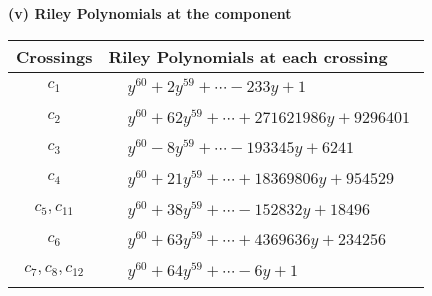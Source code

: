 \documentclass[1p]{elsarticle_modified}
\theoremstyle{definition}
\begin{document}
\newpage\renewcommand{\arraystretch}{1}
\flushleft \textbf{(v) Riley Polynomials at the component}\newline \\
\begin{tabular}{m{50pt}|m{274pt}}
Crossings & \hspace{64pt}Riley Polynomials at each crossing \\
\hline $$\begin{aligned}c_{1}\end{aligned}$$&$\begin{aligned}
&y^{60}+2 y^{59}+\cdots-233 y+1
\end{aligned}$\\
\hline $$\begin{aligned}c_{2}\end{aligned}$$&$\begin{aligned}
&y^{60}+62 y^{59}+\cdots+271621986 y+9296401
\end{aligned}$\\
\hline $$\begin{aligned}c_{3}\end{aligned}$$&$\begin{aligned}
&y^{60}-8 y^{59}+\cdots-193345 y+6241
\end{aligned}$\\
\hline $$\begin{aligned}c_{4}\end{aligned}$$&$\begin{aligned}
&y^{60}+21 y^{59}+\cdots+18369806 y+954529
\end{aligned}$\\
\hline $$\begin{aligned}c_{5},c_{11}\end{aligned}$$&$\begin{aligned}
&y^{60}+38 y^{59}+\cdots-152832 y+18496
\end{aligned}$\\
\hline $$\begin{aligned}c_{6}\end{aligned}$$&$\begin{aligned}
&y^{60}+63 y^{59}+\cdots+4369636 y+234256
\end{aligned}$\\
\hline $$\begin{aligned}c_{7},c_{8},c_{12}\end{aligned}$$&$\begin{aligned}
&y^{60}+64 y^{59}+\cdots-6 y+1
\end{aligned}$\\

\end{tabular}
\end{document}
